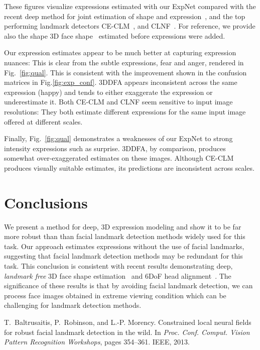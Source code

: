 \documentclass[a4paper, 10pt, conference]{ieeeconf}
\begin{document}
{These figures visualize expressions estimated with our ExpNet compared with the recent deep method for joint estimation of shape and expression~\cite{zhu2015}, and the top performing landmark detectors CE-CLM~\cite{zadeh2016deep}, and CLNF~\cite{baltrusaitis2013constrained}. For reference, we provide also the shape 3D face  shape~\cite{tran16_3dmm_cnn} estimated before expressions were added.


Our expression estimates appear to be much better at capturing expression nuances: This is clear from the subtle expressions, fear and anger, rendered in Fig.~\ref{fig:qual}. This is consistent with the improvement shown in the confusion matrices in Fig.\ref{fig:exp_conf}. 3DDFA appears inconsistent across the same expression (happy) and tends to either exaggerate the expression or underestimate it. Both CE-CLM and CLNF seem sensitive to input image resolutions: They both estimate different expressions for the same input image offered at different scales.

Finally, Fig.~\ref{fig:qual} demonstrates a weaknesses of our ExpNet to strong intensity expressions such as surprise. 3DDFA, by comparison, produces somewhat over-exaggerated estimates on these images. Although CE-CLM produces visually suitable estimates, its predictions are inconsistent across scales.


\section{Conclusions}\label{sec:conclu}
We present a method for deep, 3D expression modeling and show it to be far more robust than than facial landmark detection methods widely used for this task. Our approach estimates expressions without the use of facial landmarks, suggesting that facial landmark detection methods may be redundant for this task. This conclusion is consistent with recent results demonstrating deep, {\em landmark free} 3D face shape estimation~\cite{chang17fpn} and 6DoF head alignment~\cite{tran16_3dmm_cnn}. The significance of these results is that by avoiding facial landmark detection, we can process face images obtained in extreme viewing condition which can be challenging for landmark detection methods.

\begin{thebibliography}{10}\itemsep=-1pt

T.~Baltrusaitis, P.~Robinson, and L.-P. Morency.
\newblock Constrained local neural fields for robust facial landmark detection
  in the wild.
\newblock In {\em Proc. Conf. Comput. Vision Pattern Recognition Workshops},
  pages 354--361. IEEE, 2013.


\end{thebibliography}}
\end{document}
